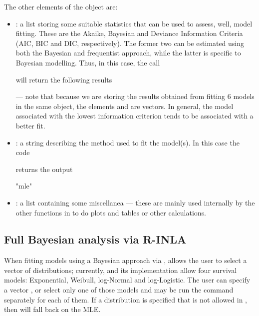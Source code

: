 \documentclass[article,nojss]{jss}
\newcommand{\R}{\proglang{R}\xspace}
\newcommand{\sh}{\proglang{survHE}\xspace}
\newcommand{\INLA}{\proglang{INLA}\xspace}
\begin{document}
The other elements of the object  are: 
\begin{itemize}
\item {}: a list storing some suitable statistics that can be used to assess, well, model fitting. These are the Akaike, Bayesian and Deviance Information Criteria (AIC, BIC and DIC, respectively). The former two can be estimated using both the Bayesian and frequentist approach, while the latter is specific to Bayesian modelling. Thus, in this case, the \R call 
will return the following results
--- note that because we are storing the results obtained from fitting 6 models in the same object, the elements  and  %
are vectors. In general, the model associated with the lowest information criterion tends to be associated with a better fit.
\item {}: a string describing the method used to fit the model(s). In this case the code
returns the output
\begin{CodeOutput}
"mle"
\end{CodeOutput}
\item {}: a list containing some miscellanea --- these are mainly used internally by the other functions in \sh to do plots and tables or other calculations. 
\end{itemize}

\subsection{Full Bayesian analysis via R-INLA}\label{model_inla}
When fitting models using a Bayesian approach via \INLA, \sh allows the user to select a vector of distributions; currently, \INLA and its \R implementation allow four survival models: Exponential, Weibull, log-Normal and log-Logistic. The user can specify a vector , or select only one of those models and may be run the  command separately for each of them. If a distribution is specified that is not allowed in \INLA, then \sh will fall back on the MLE.
\end{document}
